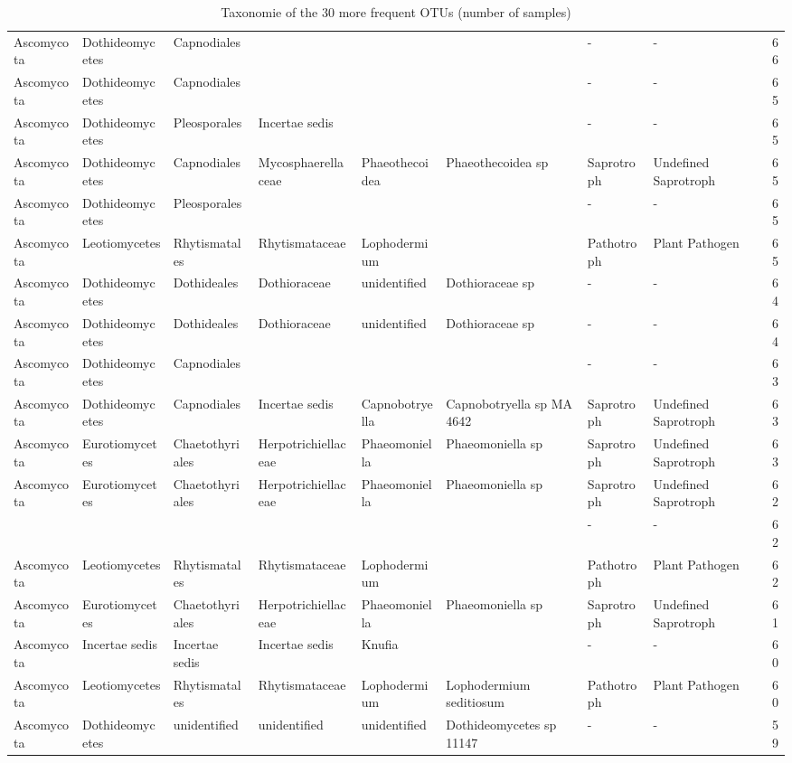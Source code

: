 \documentclass[12pt]{article}\usepackage[]{graphicx}\usepackage[]{color}
\numberwithin{figure}{section}
\begin{document}
\begin{landscape}
\begin{table}[ht]
\begin{tabular}{llllllllr}
  Ascomycota & Dothideomycetes & Capnodiales &  &  &  & - & - & 66 \\ 
  Ascomycota & Dothideomycetes & Capnodiales &  &  &  & - & - & 65 \\ 
  Ascomycota & Dothideomycetes & Pleosporales & Incertae sedis &  &  & - & - & 65 \\ 
  Ascomycota & Dothideomycetes & Capnodiales & Mycosphaerellaceae & Phaeothecoidea & Phaeothecoidea sp & Saprotroph & Undefined Saprotroph & 65 \\ 
  Ascomycota & Dothideomycetes & Pleosporales &  &  &  & - & - & 65 \\ 
  Ascomycota & Leotiomycetes & Rhytismatales & Rhytismataceae & Lophodermium &  & Pathotroph & Plant Pathogen & 65 \\ 
  Ascomycota & Dothideomycetes & Dothideales & Dothioraceae & unidentified & Dothioraceae sp & - & - & 64 \\ 
  Ascomycota & Dothideomycetes & Dothideales & Dothioraceae & unidentified & Dothioraceae sp & - & - & 64 \\ 
  Ascomycota & Dothideomycetes & Capnodiales &  &  &  & - & - & 63 \\ 
  Ascomycota & Dothideomycetes & Capnodiales & Incertae sedis & Capnobotryella & Capnobotryella sp MA 4642 & Saprotroph & Undefined Saprotroph & 63 \\ 
  Ascomycota & Eurotiomycetes & Chaetothyriales & Herpotrichiellaceae & Phaeomoniella & Phaeomoniella sp & Saprotroph & Undefined Saprotroph & 63 \\ 
  Ascomycota & Eurotiomycetes & Chaetothyriales & Herpotrichiellaceae & Phaeomoniella & Phaeomoniella sp & Saprotroph & Undefined Saprotroph & 62 \\ 
   &  &  &  &  &  & - & - & 62 \\ 
  Ascomycota & Leotiomycetes & Rhytismatales & Rhytismataceae & Lophodermium &  & Pathotroph & Plant Pathogen & 62 \\ 
  Ascomycota & Eurotiomycetes & Chaetothyriales & Herpotrichiellaceae & Phaeomoniella & Phaeomoniella sp & Saprotroph & Undefined Saprotroph & 61 \\ 
  Ascomycota & Incertae sedis & Incertae sedis & Incertae sedis & Knufia &  & - & - & 60 \\ 
  Ascomycota & Leotiomycetes & Rhytismatales & Rhytismataceae & Lophodermium & Lophodermium seditiosum & Pathotroph & Plant Pathogen & 60 \\ 
  Ascomycota & Dothideomycetes & unidentified & unidentified & unidentified & Dothideomycetes sp 11147 & - & - & 59 \\ 
   \hline
\end{tabular}
\endgroup
\caption{Taxonomie of the 30 more frequent OTUs (number of samples)} 
\end{table}

\end{landscape}
\end{document}
